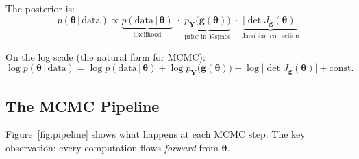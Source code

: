 \documentclass[11pt,a4paper]{article}
\theoremstyle{definition}
\newcommand{\given}{\,|\,}
\newcommand{\btheta}{\boldsymbol{\theta}}
\begin{document}
The posterior is:
\begin{equation}
    p(\btheta \given \text{data}) \propto
    \underbrace{p(\text{data} \given \btheta)}_{\text{likelihood}}
    \;\cdot\;
    \underbrace{p_{\mathbf{Y}}\!\big(\mathbf{g}(\btheta)\big)}_{\text{prior in }Y\text{-space}}
    \;\cdot\;
    \underbrace{\big|\!\det J_{\mathbf{g}}(\btheta)\big|}_{\text{Jacobian correction}}
\end{equation}

On the log scale (the natural form for MCMC):
\begin{equation}
    \label{eq:log_posterior}
    \log p(\btheta \given \text{data}) = \log p(\text{data} \given \btheta)
    + \log p_{\mathbf{Y}}\!\big(\mathbf{g}(\btheta)\big)
    + \log\big|\!\det J_{\mathbf{g}}(\btheta)\big| + \text{const.}
\end{equation}

\subsection{The MCMC Pipeline}

Figure~\ref{fig:pipeline} shows what happens at each MCMC step. The key
observation: every computation flows \emph{forward} from $\btheta$.
\end{document}
